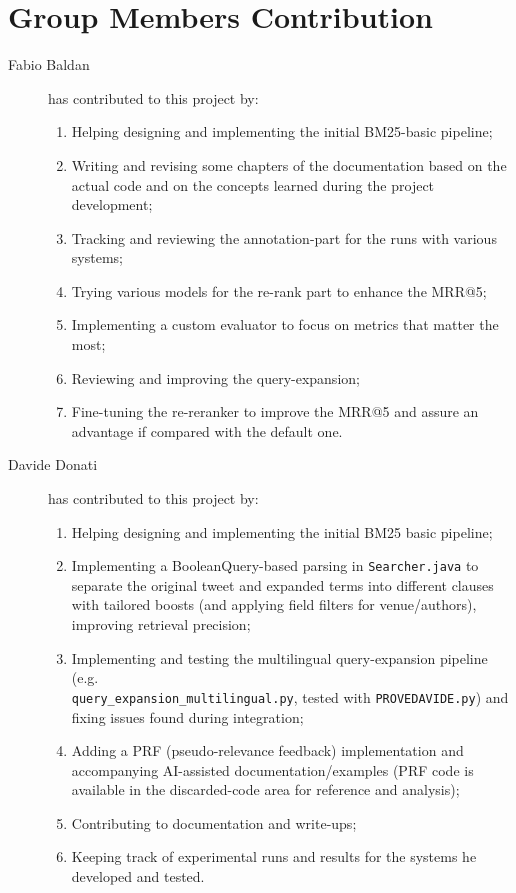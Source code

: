\section{Group Members Contribution}


\begin{description}
	\item[Fabio Baldan] has contributed to this project by:
    \begin{enumerate}
        \item Helping designing and implementing the initial BM25-basic pipeline;
        \item Writing and revising some chapters of the documentation based on the actual code and on the concepts learned during the project development;
        \item Tracking and reviewing the annotation-part for the runs with various systems;
        \item Trying various models for the re-rank part to enhance the MRR@5;
        \item Implementing a custom evaluator to focus on metrics that matter the most;
        \item Reviewing and improving the query-expansion;
        \item Fine-tuning the re-reranker to improve the MRR@5 and assure an advantage if compared with the default one.
    \end{enumerate}

    \item[Davide Donati] has contributed to this project by:
    \begin{enumerate}
        \item Helping designing and implementing the initial BM25 basic pipeline;
        \item Implementing a BooleanQuery-based parsing in \texttt{Searcher.java} to separate the original tweet and expanded terms into different clauses with tailored boosts (and applying field filters for venue/authors), improving retrieval precision;
        \item Implementing and testing the multilingual query-expansion pipeline (e.g. \\\texttt{query\_expansion\_multilingual.py}, tested with \texttt{PROVEDAVIDE.py}) and fixing issues found during integration;
        \item Adding a PRF (pseudo-relevance feedback) implementation and accompanying AI-assisted documentation/examples (PRF code is available in the discarded-code area for reference and analysis);
        \item Contributing to documentation and write-ups;
        \item Keeping track of experimental runs and results for the systems he developed and tested.
    \end{enumerate}


\end{description}
